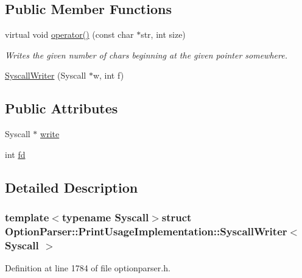 \subsection*{Public Member Functions}
\begin{DoxyCompactItemize}
\item 
virtual void \hyperlink{struct_option_parser_1_1_print_usage_implementation_1_1_syscall_writer_a9de8cdfa5e29ce4f436031eba06b3029}{operator()} (const char $\ast$str, int size)
\begin{DoxyCompactList}\small\item\em Writes the given number of chars beginning at the given pointer somewhere. \end{DoxyCompactList}\item 
\hyperlink{struct_option_parser_1_1_print_usage_implementation_1_1_syscall_writer_a99b5ebc53f8b142aa08a2684aa9a3791}{Syscall\-Writer} (Syscall $\ast$w, int f)
\end{DoxyCompactItemize}
\subsection*{Public Attributes}
\begin{DoxyCompactItemize}
\item 
Syscall $\ast$ \hyperlink{struct_option_parser_1_1_print_usage_implementation_1_1_syscall_writer_a1a2d91d76791d2f6769088ccca1a32dc}{write}
\item 
int \hyperlink{struct_option_parser_1_1_print_usage_implementation_1_1_syscall_writer_af64926aa8f6539bd22e77b8d51132fbc}{fd}
\end{DoxyCompactItemize}


\subsection{Detailed Description}
\subsubsection*{template$<$typename Syscall$>$struct Option\-Parser\-::\-Print\-Usage\-Implementation\-::\-Syscall\-Writer$<$ Syscall $>$}



Definition at line 1784 of file optionparser.\-h.



